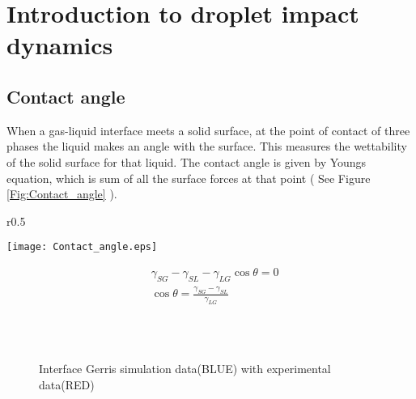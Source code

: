 \chapter{Introduction to droplet impact dynamics}

\section{Contact angle}
When a gas-liquid interface meets a solid surface, at the point of contact of three phases the liquid makes an angle with the surface. This measures the wettability of 
the solid surface for that liquid. The contact angle is given by Youngs equation, which is sum of all the surface forces at that point ( See Figure \ref{Fig:Contact_angle} ).
\begin{wrapfigure}{r}{0.5\textwidth}
  \begin{center}
    \texttt{[image: Contact\_angle.eps]}
  \end{center}
  \caption{Contact angle}
  \label{Fig:Contact_angle}
\end{wrapfigure}
\begin{equation}
 \boxed{ \begin{align}
 &\gamma_{SG} -\gamma_{SL} - \gamma_{LG} \cos \theta =0  \\
 &\cos \theta =\frac{\gamma_{SG} -\gamma_{SL}}{\gamma_{LG}} 
 \end{align}
 }
\end{equation}
\begin{figure}
 \centering
       \\
       \\
 \caption{Interface Gerris simulation data(BLUE) with \cite{Clanet2004} experimental data(RED)}
 \label{Fig:gs6}
 \end{figure}
